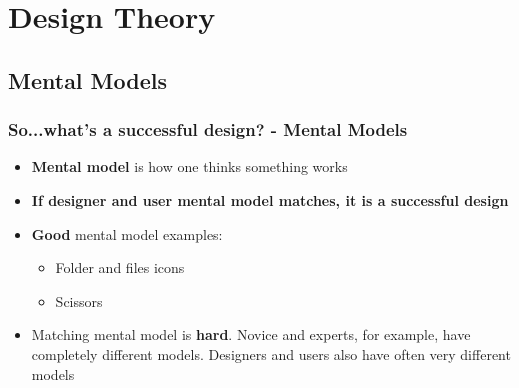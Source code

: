 \documentclass{beamer}
\begin{document}

\section{Design Theory}

\subsection{Mental Models}
\begin{frame}
\frametitle{So...what's a successful design?  - Mental Models}
\begin{itemize}
	\item \textbf{Mental model} is how one thinks something works
	\item \textbf{If designer and user mental model matches, it is a successful design}
	\item \textbf{Good} mental model examples: 
	\begin{itemize}
		\item Folder and files icons
		\item Scissors
	\end{itemize}		
	\item Matching mental model is \textbf{hard}.  Novice and experts, for example, have completely different models.   Designers and users also have often very different models
\end{itemize}
\end{frame}
\end{document}
